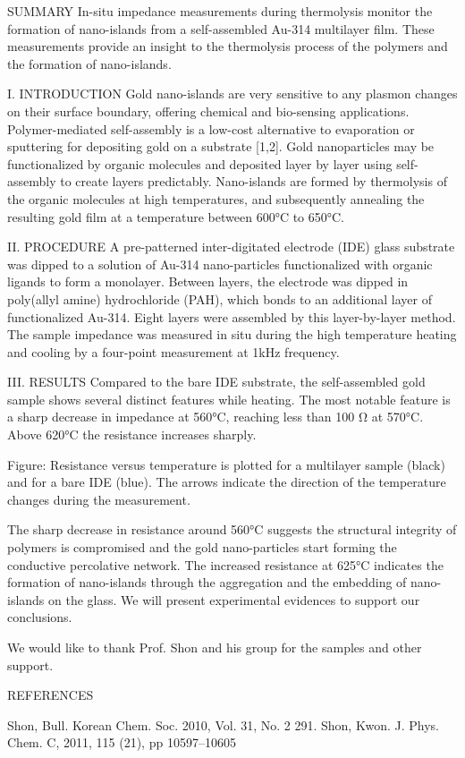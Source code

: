 SUMMARY
In-situ impedance measurements during thermolysis monitor the formation of nano-islands from a self-assembled Au-314 multilayer film. 
These measurements provide an insight to the thermolysis process of the polymers and the formation of nano-islands.

I. INTRODUCTION
Gold nano-islands are very sensitive to any plasmon changes on their surface boundary, offering chemical and bio-sensing applications.  
Polymer-mediated self-assembly is a low-cost alternative to evaporation or sputtering for depositing gold on a substrate [1,2]. 
Gold nanoparticles may be functionalized by organic molecules and deposited layer by layer using self-assembly to create layers predictably.
Nano-islands are formed by thermolysis of the organic molecules at high temperatures, and
subsequently annealing the resulting gold film at a temperature between 600°C to 650°C.

II. PROCEDURE
A pre-patterned inter-digitated electrode (IDE) glass substrate was dipped to a solution of Au-314 nano-particles functionalized with organic ligands to form a monolayer. 
Between layers, the electrode was dipped in poly(allyl amine) hydrochloride (PAH), which bonds to an additional layer of functionalized Au-314. Eight layers were assembled by this layer-by-layer method.
The sample impedance was measured in situ during the high temperature heating and cooling by a four-point measurement at 1kHz frequency.

III. RESULTS
Compared to the bare IDE substrate, the self-assembled gold sample shows several distinct
features while heating. The most notable feature is a sharp decrease in impedance at 560°C, reaching less than 100 Ω at 570°C.
Above 620°C the resistance increases sharply.

Figure: Resistance versus temperature is plotted for a multilayer sample (black) and for a bare IDE (blue). 
The arrows indicate the direction of the temperature changes during the measurement.

The sharp decrease in resistance around 560°C suggests the structural integrity of polymers is compromised and the gold nano-particles start forming the conductive percolative network.
The increased resistance at 625°C indicates the formation of nano-islands through the aggregation and the embedding of nano-islands on the glass.
We will present experimental evidences to support our conclusions.

We would like to thank Prof. Shon and his group for the samples and other support.

REFERENCES

Shon, Bull. Korean Chem. Soc. 2010, Vol. 31, No. 2 291.
Shon, Kwon. J. Phys. Chem. C, 2011, 115 (21), pp 10597–10605
